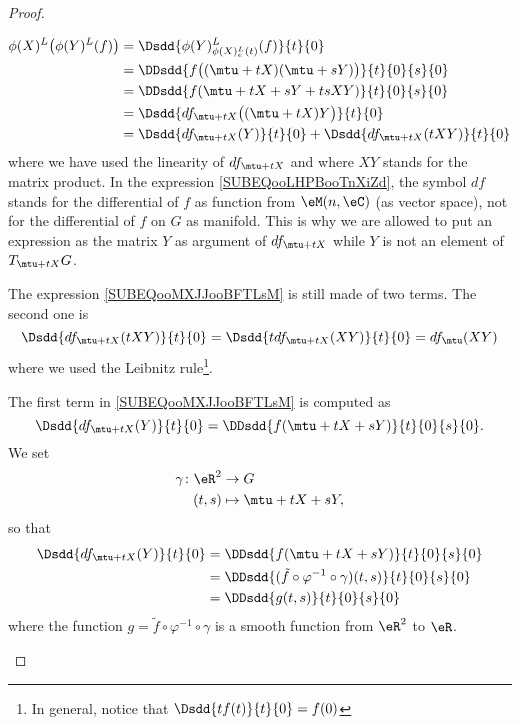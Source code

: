 \begin{proof}
\begin{subproof}
\begin{subequations}
\begin{align}
                    \phi(X)^L\big( \phi(Y)^L(f) \big)&=\Dsdd{ \phi(Y)^L_{\phi(X)^L_e(t)}(f) }{t}{0}\\
                    &=\DDsdd{ f\big( (\mtu+tX)(\mtu+sY) \big) }{t}{0}{s}{0}\\
                    &=\DDsdd{ f(\mtu+tX+sY+tsXY) }{t}{0}{s}{0}\\
                    &=\Dsdd{ df_{\mtu+tX}\big( (\mtu+tX)Y \big) }{t}{0} \label{SUBEQooLHPBooTnXiZd}\\
                    &=\Dsdd{ df_{\mtu+tX}(Y) }{t}{0}+\Dsdd{ df_{\mtu+tX}(tXY) }{t}{0}   \label{SUBEQooMXJJooBFTLsM}
                \end{align}
            \end{subequations}
            where we have used the linearity of \( df_{\mtu+tX}\) and where \( XY\) stands for the matrix product. In the expression \eqref{SUBEQooLHPBooTnXiZd}, the symbol \( df\) stands for the differential of \( f\) as function from \( \eM(n,\eC)\) (as vector space), not for the differential of \( f\) on \( G\) as manifold. This is why we are allowed to put an expression as the matrix \( Y\) as argument of \( df_{\mtu+tX}\) while \( Y\) is not an element of \( T_{\mtu+tX}G\).

            The expression \eqref{SUBEQooMXJJooBFTLsM} is still made of two terms. The second one is
            \begin{equation}
                \Dsdd{ df_{\mtu+tX}(tXY) }{t}{0}=\Dsdd{ tdf_{\mtu+tX}(XY) }{t}{0}=df_{\mtu}(XY)
            \end{equation}
            where we used the Leibnitz rule\footnote{In general, notice that \( \Dsdd{ tf(t) }{t}{0}=f(0)\)}.

            The first term in \eqref{SUBEQooMXJJooBFTLsM} is computed as
            \begin{equation}
                    \Dsdd{ df_{\mtu+tX}(Y) }{t}{0}=\DDsdd{ f(\mtu+tX+sY) }{t}{0}{s}{0}.
            \end{equation}
            We set 
            \begin{equation}
                \begin{aligned}
                    \gamma\colon \eR^2&\to G \\
                    (t,s)&\mapsto \mtu+tX+sY, 
                \end{aligned}
            \end{equation}
            so that
            \begin{subequations}
                \begin{align}
                    \Dsdd{ df_{\mtu+tX}(Y) }{t}{0}&=\DDsdd{ f(\mtu+tX+sY) }{t}{0}{s}{0}\\
                    &=\DDsdd{ (\tilde f\circ\varphi^{-1}\circ\gamma)(t,s) }{t}{0}{s}{0}\\
                    &=\DDsdd{ g(t,s) }{t}{0}{s}{0}
                \end{align}
            \end{subequations}
            where the function \( g=\tilde f\circ\varphi^{-1}\circ \gamma\) is a smooth function from \( \eR^2\) to \( \eR\).        


\end{subproof}
\end{proof}
